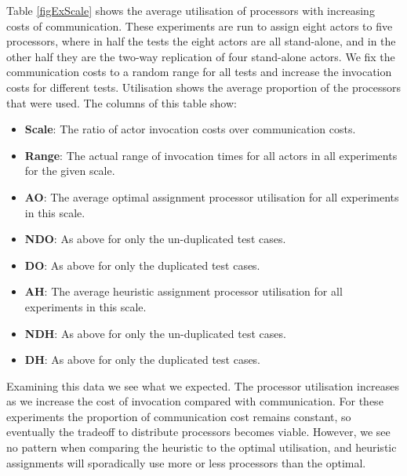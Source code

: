 Table \ref{figExScale} shows the average utilisation of processors with increasing costs of communication.
These experiments are run to assign eight actors to five processors, where in half the tests the eight actors are all stand-alone, and in the other half they are the two-way replication of four stand-alone actors.
We fix the communication costs to a random range for all tests and increase the invocation costs for different tests.
Utilisation shows the average proportion of the processors that were used.
The columns of this table show:
\begin{itemize}
	\item {\bf Scale}: The ratio of actor invocation costs over communication costs.
	\item {\bf Range}: The actual range of invocation times for all actors in all experiments for the given scale.
	\item {\bf AO}: The average optimal assignment processor utilisation for all experiments in this scale.
	\item {\bf NDO}: As above for only the un-duplicated test cases.
	\item {\bf DO}: As above for only the duplicated test cases.
	\item {\bf AH}: The average heuristic assignment processor utilisation for all experiments in this scale.
	\item {\bf NDH}: As above for only the un-duplicated test cases.
	\item {\bf DH}: As above for only the duplicated test cases.
\end{itemize}

Examining this data we see what we expected.
The processor utilisation increases as we increase the cost of invocation compared with communication.
For these experiments the proportion of communication cost remains constant, so eventually the tradeoff to distribute processors becomes viable.
However, we see no pattern when comparing the heuristic to the optimal utilisation, and heuristic assignments will sporadically use more or less processors than the optimal.

